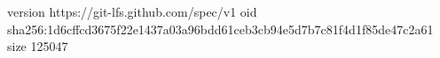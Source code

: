 version https://git-lfs.github.com/spec/v1
oid sha256:1d6cffcd3675f22e1437a03a96bdd61ceb3cb94e5d7b7c81f4d1f85de47c2a61
size 125047

